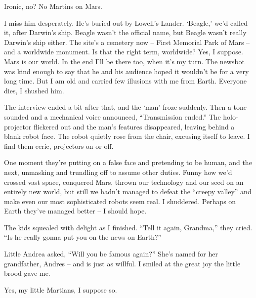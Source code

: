 \documentclass[11pt,a4paper]{article}
\newcommand{\storybreak}{%
  \par\vspace{0.6\baselineskip}
  \begin{center}\color{storyblue}\small *\enspace *\enspace *\end{center}
  \vspace{0.3\baselineskip}\noindent\ignorespaces
}
\begin{document}
Ironic, no? No Martins on Mars.

I miss him desperately. He’s buried out by Lowell’s Lander. ‘Beagle,’ we’d called it, after Darwin’s ship. Beagle wasn’t the official name, but Beagle wasn’t really Darwin’s ship either. The site’s a cemetery now – First Memorial Park of Mars – and a worldwide monument. Is that the right term, worldwide? Yes, I suppose. Mars is our world. In the end I’ll be there too, when it’s my turn. The newsbot was kind enough to say that he and his audience hoped it wouldn’t be for a very long time. But I am old and carried few illusions with me from Earth. Everyone dies, I shushed him.

The interview ended a bit after that, and the ‘man’ froze suddenly. Then a tone sounded and a mechanical voice announced, “Transmission ended.” The holo-projector flickered out and the man’s features disappeared, leaving behind a blank robot face. The robot quietly rose from the chair, excusing itself to leave. I find them eerie, projectors on or off.

One moment they’re putting on a false face and pretending to be human, and the next, unmasking and trundling off to assume other duties. Funny how we’d crossed vast space, conquered Mars, thrown our technology and our seed on an entirely new world, but still we hadn’t managed to defeat the “creepy valley” and make even our most sophisticated robots seem real. I shuddered. Perhaps on Earth they’ve managed better – I should hope.

\storybreak

The kids squealed with delight as I finished. “Tell it again, Grandma,” they cried. “Is he really gonna put you on the news on Earth?”

Little Andrea asked, “Will you be famous again?” She’s named for her grandfather, Andres – and is just as willful. I smiled at the great joy the little brood gave me.

Yes, my little Martians, I suppose so.
\end{document}

